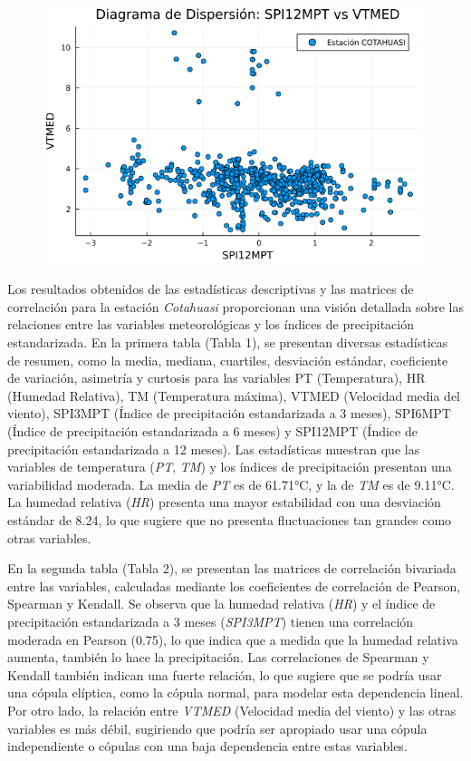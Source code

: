 \begin{figure}[htbp]
\begin{minipage}{0.32\textwidth}
    \includegraphics[width=\linewidth]{Capitulos/Scaterplot/COTAHUASI_SPI12MPT_vs_VTMED.png}
\end{minipage}

\end{figure}



Los resultados obtenidos de las estadísticas descriptivas y las matrices de correlación para la estación \textit{Cotahuasi} proporcionan una visión detallada sobre las relaciones entre las variables meteorológicas y los índices de precipitación estandarizada. En la primera tabla (Tabla 1), se presentan diversas estadísticas de resumen, como la media, mediana, cuartiles, desviación estándar, coeficiente de variación, asimetría y curtosis para las variables PT (Temperatura), HR (Humedad Relativa), TM (Temperatura máxima), VTMED (Velocidad media del viento), SPI3MPT (Índice de precipitación estandarizada a 3 meses), SPI6MPT (Índice de precipitación estandarizada a 6 meses) y SPI12MPT (Índice de precipitación estandarizada a 12 meses). Las estadísticas muestran que las variables de temperatura (\textit{PT}, \textit{TM}) y los índices de precipitación presentan una variabilidad moderada. La media de \textit{PT} es de 61.71°C, y la de \textit{TM} es de 9.11°C. La humedad relativa (\textit{HR}) presenta una mayor estabilidad con una desviación estándar de 8.24, lo que sugiere que no presenta fluctuaciones tan grandes como otras variables.

En la segunda tabla (Tabla 2), se presentan las matrices de correlación bivariada entre las variables, calculadas mediante los coeficientes de correlación de Pearson, Spearman y Kendall. Se observa que la humedad relativa (\textit{HR}) y el índice de precipitación estandarizada a 3 meses (\textit{SPI3MPT}) tienen una correlación moderada en Pearson (0.75), lo que indica que a medida que la humedad relativa aumenta, también lo hace la precipitación. Las correlaciones de Spearman y Kendall también indican una fuerte relación, lo que sugiere que se podría usar una cópula elíptica, como la cópula normal, para modelar esta dependencia lineal. Por otro lado, la relación entre \textit{VTMED} (Velocidad media del viento) y las otras variables es más débil, sugiriendo que podría ser apropiado usar una cópula independiente o cópulas con una baja dependencia entre estas variables.

